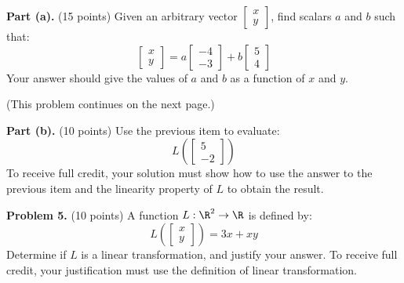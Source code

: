 \documentclass[12pt]{article}
\begin{document}
\textbf{Part (a).} (15 points) Given an arbitrary vector $\begin{bmatrix}x\\y\end{bmatrix}$, find scalars $a$ and $b$ such that:
\[
\begin{bmatrix}x\\y\end{bmatrix}=a\left[\begin{matrix}-4\\-3\end{matrix}\right]+b\left[\begin{matrix}5\\4\end{matrix}\right]
\]
Your answer should give the values of $a$ and $b$ as a function of $x$ and $y$.

\vfill
(This problem continues on the next page.)

\clearpage

\textbf{Part (b).} (10 points) Use the previous item to evaluate:
\[
L\left(\begin{bmatrix}5\\-2\end{bmatrix}\right)
\]
To receive full credit, your solution must show how to use the answer to the previous item and the linearity property of $L$ to obtain the result. 

\clearpage

\textbf{Problem 5.} (10 points) A function $L:\R^2\to\R$ is defined by:
\[
L\left(\begin{bmatrix}x\\y\end{bmatrix}\right)=3x+xy
\]
Determine if $L$ is a linear transformation, and justify your answer. To receive full credit, your justification must use the definition of linear transformation.
\end{document}
